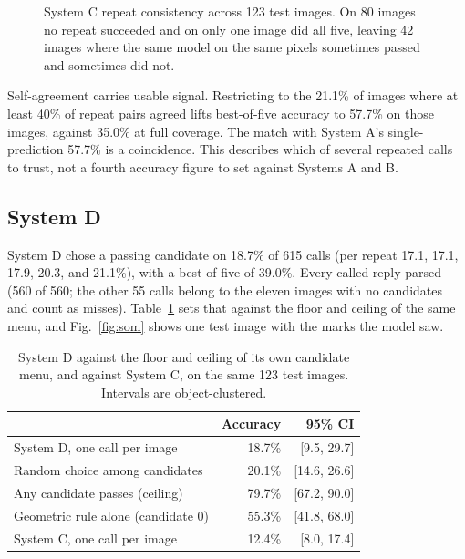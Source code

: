 \documentclass[12pt,letterpaper]{article}
\begin{document}
\begin{figure}[H]
\centering
{}
\caption{System C repeat consistency across 123 test images. On 80
images no repeat succeeded and on only one image did all five, leaving
42 images where the same model on the same pixels sometimes passed and
sometimes did not.}
\label{fig:repeats}
\end{figure}

Self-agreement carries usable signal. Restricting to the 21.1\% of
images where at least 40\% of repeat pairs agreed lifts best-of-five
accuracy to 57.7\% on those images, against 35.0\% at full coverage.
The match with System A's single-prediction 57.7\% is a coincidence.
This describes
which of several repeated calls to trust, not a fourth accuracy figure
to set against Systems A and B.

\subsection{System D}

System D chose a passing candidate on 18.7\% of 615 calls (per repeat
17.1, 17.1, 17.9, 20.3, and 21.1\%), with a best-of-five of 39.0\%.
Every called reply parsed (560 of 560; the other 55 calls belong to the
eleven images with no candidates and count as misses).
Table~\ref{tab:som} sets that against the floor and ceiling of the
same menu, and Fig.~\ref{fig:som} shows one test image with the marks
the model saw.

\begin{table}[H]
\centering
\caption{System D against the floor and ceiling of its own candidate
menu, and against System C, on the same 123 test images. Intervals are
object-clustered.}
\label{tab:som}
\begin{tabular}{lrr}
\toprule
 & Accuracy & 95\% CI \\
\midrule
System D, one call per image     & 18.7\% & [9.5, 29.7]  \\
Random choice among candidates   & 20.1\% & [14.6, 26.6] \\
Any candidate passes (ceiling)   & 79.7\% & [67.2, 90.0] \\
Geometric rule alone (candidate 0) & 55.3\% & [41.8, 68.0] \\
System C, one call per image     & 12.4\% & [8.0, 17.4]  \\
\bottomrule
\end{tabular}
\end{table}
\end{document}
